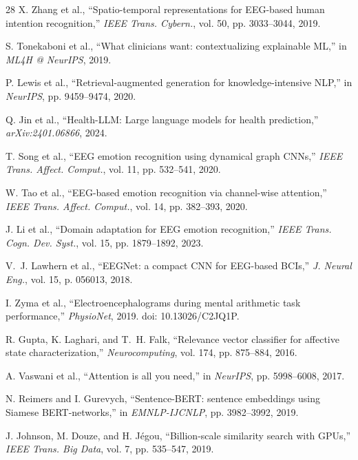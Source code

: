 \documentclass[journal,twoside]{IEEEtran}
\begin{document}
\begin{thebibliography}{28}
X. Zhang et al., ``Spatio-temporal representations for EEG-based human intention recognition,'' \textit{IEEE Trans. Cybern.}, vol. 50, pp. 3033--3044, 2019.

S. Tonekaboni et al., ``What clinicians want: contextualizing explainable ML,'' in \textit{ML4H @ NeurIPS}, 2019.

P. Lewis et al., ``Retrieval-augmented generation for knowledge-intensive NLP,'' in \textit{NeurIPS}, pp. 9459--9474, 2020.

Q. Jin et al., ``Health-LLM: Large language models for health prediction,'' \textit{arXiv:2401.06866}, 2024.

T. Song et al., ``EEG emotion recognition using dynamical graph CNNs,'' \textit{IEEE Trans. Affect. Comput.}, vol. 11, pp. 532--541, 2020.

W. Tao et al., ``EEG-based emotion recognition via channel-wise attention,'' \textit{IEEE Trans. Affect. Comput.}, vol. 14, pp. 382--393, 2020.

J. Li et al., ``Domain adaptation for EEG emotion recognition,'' \textit{IEEE Trans. Cogn. Dev. Syst.}, vol. 15, pp. 1879--1892, 2023.

V.~J. Lawhern et al., ``EEGNet: a compact CNN for EEG-based BCIs,'' \textit{J. Neural Eng.}, vol. 15, p. 056013, 2018.

I. Zyma et al., ``Electroencephalograms during mental arithmetic task performance,'' \textit{PhysioNet}, 2019. doi: 10.13026/C2JQ1P.

R. Gupta, K. Laghari, and T.~H. Falk, ``Relevance vector classifier for affective state characterization,'' \textit{Neurocomputing}, vol. 174, pp. 875--884, 2016.

A. Vaswani et al., ``Attention is all you need,'' in \textit{NeurIPS}, pp. 5998--6008, 2017.

N. Reimers and I. Gurevych, ``Sentence-BERT: sentence embeddings using Siamese BERT-networks,'' in \textit{EMNLP-IJCNLP}, pp. 3982--3992, 2019.

J. Johnson, M. Douze, and H. J{\'e}gou, ``Billion-scale similarity search with GPUs,'' \textit{IEEE Trans. Big Data}, vol. 7, pp. 535--547, 2019.


\end{thebibliography}
\end{document}
